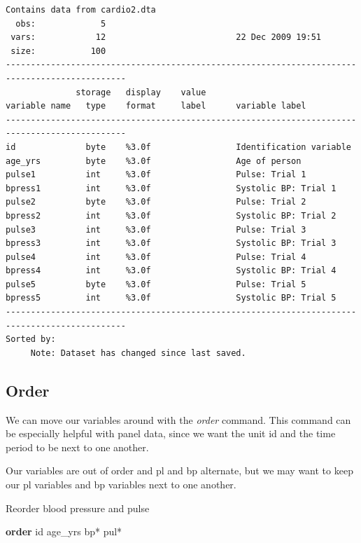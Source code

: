 \documentclass[
]{book}
\newenvironment{Shaded}{\begin{snugshade}}{\end{snugshade}}
\newcommand{\KeywordTok}[1]{\textcolor[rgb]{0.13,0.29,0.53}{\textbf{#1}}}
\newcommand{\NormalTok}[1]{#1}
\begin{document}
\begin{verbatim}
Contains data from cardio2.dta
  obs:             5                          
 vars:            12                          22 Dec 2009 19:51
 size:           100                          
----------------------------------------------------------------------------------------------
              storage   display    value
variable name   type    format     label      variable label
----------------------------------------------------------------------------------------------
id              byte    %3.0f                 Identification variable
age_yrs         byte    %3.0f                 Age of person
pulse1          int     %3.0f                 Pulse: Trial 1
bpress1         int     %3.0f                 Systolic BP: Trial 1
pulse2          byte    %3.0f                 Pulse: Trial 2
bpress2         int     %3.0f                 Systolic BP: Trial 2
pulse3          int     %3.0f                 Pulse: Trial 3
bpress3         int     %3.0f                 Systolic BP: Trial 3
pulse4          int     %3.0f                 Pulse: Trial 4
bpress4         int     %3.0f                 Systolic BP: Trial 4
pulse5          byte    %3.0f                 Pulse: Trial 5
bpress5         int     %3.0f                 Systolic BP: Trial 5
----------------------------------------------------------------------------------------------
Sorted by: 
     Note: Dataset has changed since last saved.
\end{verbatim}

\subsection{Order}\label{order}

We can move our variables around with the \emph{order} command. This command can be especially helpful with panel data, since we want the unit id and the time period to be next to one another.

Our variables are out of order and pl and bp alternate, but we may want to keep our pl variables and bp variables next to one another.

Reorder blood pressure and pulse

\begin{Shaded}
\begin{Highlighting}[]
\KeywordTok{order}\NormalTok{ id age\_yrs bp* pul*}
\end{Highlighting}
\end{Shaded}
\end{document}
